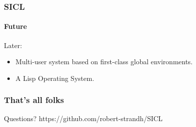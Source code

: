 \documentclass[12pt]{beamer}
\def\inputfig#1{}
\begin{document}
\begin{frame}
  \frametitle{SICL}
  \framesubtitle{Future}
Later:
\begin{itemize}
\item Multi-user system based on first-class global environments. 
\item A Lisp Operating System.
\end{itemize}
\end{frame}
\begin{frame}
  \frametitle{That's all folks}
  
Questions?
\vskip 0.5cm
https://github.com/robert-strandh/SICL

  \begin{center}
\inputfig{lizard.pdf_t}
  \end{center}

\end{frame}
\end{document}
